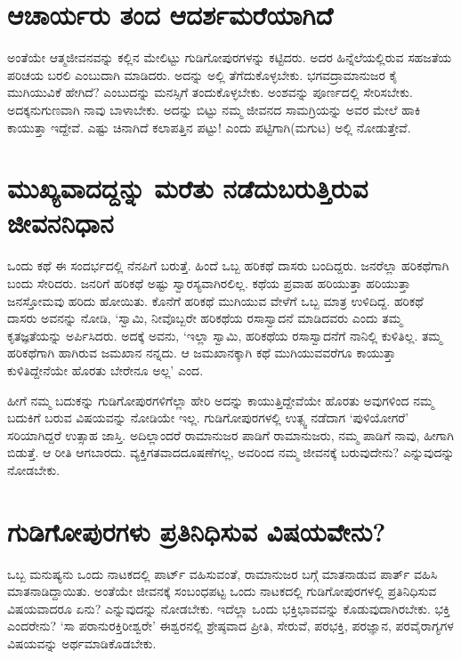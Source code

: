 \section*{ಆಚಾರ್ಯರು ತಂದ ಆದರ್ಶಮರೆಯಾಗಿದೆ}

ಅಂತೆಯೇ ಆತ್ಮಜೀವನವನ್ನು ಕಲ್ಲಿನ ಮೇಲಿಟ್ಟು ಗುಡಿಗೋಪುರಗಳನ್ನು ಕಟ್ಟಿದರು. ಅದರ ಹಿನ್ನೆಲೆಯಲ್ಲಿರುವ ಸಹಜತೆಯ ಪರಿಚಯ ಬರಲಿ ಎಂಬುದಾಗಿ ಮಾಡಿದರು. ಅದನ್ನು ಅಲ್ಲಿ ತೆಗೆದುಕೊಳ್ಳಬೇಕು. ಭಗವದ್ರಾಮಾನುಜರ ಕೈ ಮುಗಿಯುವಿಕೆ ಹೇಗಿದೆ? ಎಂಬುದನ್ನು ಮನಸ್ಸಿಗೆ ತಂದುಕೊಳ್ಳಬೇಕು. ಅಂಶವನ್ನು ಪೂರ್ಣದಲ್ಲಿ ಸೇರಿಸಬೇಕು. ಅದಕ್ಕನುಗುಣವಾಗಿ ನಾವು ಬಾಳಾಬೇಕು. ಅದನ್ನು ಬಿಟ್ಟು ನಮ್ಮ ಜೀವನದ ಸಾಮಗ್ರಿಯನ್ನು ಅವರ ಮೇಲೆ ಹಾಕಿ ಕಾಯುತ್ತಾ ಇದ್ದೇವೆ. ಎಷ್ಟು ಚಿನಾಗಿದೆ ಕಲಾಪತ್ತಿನ ಪಟ್ಟು! ಎಂದು ಪಟ್ಟಿಗಾಗಿ(ಮಗುಟ) ಅಲ್ಲಿ ನೋಡುತ್ತೇವೆ. 

\section*{ಮುಖ್ಯವಾದದ್ದನ್ನು ಮರೆತು ನಡೆದುಬರುತ್ತಿರುವ ಜೀವನನಿಧಾನ}

ಒಂದು ಕಥೆ ಈ ಸಂದರ್ಭದಲ್ಲಿ ನೆನಪಿಗೆ ಬರುತ್ತೆ. ಹಿಂದೆ ಒಬ್ಬ ಹರಿಕಥೆ ದಾಸರು ಬಂದಿದ್ದರು. ಜನರೆಲ್ಲಾ ಹರಿಕಥೆಗಾಗಿ ಬಂದು ಸೇರಿದರು. ಜನರಿಗೆ ಹರಿಕಥೆ ಅಷ್ಟು  ಸ್ವಾರಸ್ಯವಾಗಿರಲಿಲ್ಲ. ಕಥೆಯ ಪ್ರವಾಹ ಹರಿಯುತ್ತಾ ಹರಿಯುತ್ತಾ ಜನಸ್ತೋಮವು ಹರಿದು ಹೋಯಿತು. ಕೊನೆಗೆ ಹರಿಕಥೆ ಮುಗಿಯುವ ವೇಳೆಗೆ ಒಬ್ಬ ಮಾತ್ರ ಉಳಿದಿದ್ದ. ಹರಿಕಥೆ ದಾಸರು ಅವನನ್ನು ನೋಡಿ, `ಸ್ವಾಮಿ, ನೀವೊಬ್ಬರೇ ಹರಿಕಥೆಯ ರಸಾಸ್ವಾದನೆ ಮಾಡಿದವರು ಎಂದು ತಮ್ಮ ಕೃತಜ್ಞತೆಯನ್ನು ಅರ್ಪಿಸಿದರು. ಅದಕ್ಕೆ ಅವನು, `ಇಲ್ಲಾ ಸ್ವಾಮಿ, ಹರಿಕಥೆಯ ರಸಾಸ್ವಾದನೆಗೆ ನಾನಿಲ್ಲಿ ಕುಳಿತಿಲ್ಲ. ತಮ್ಮ ಹರಿಕಥೆಗಾಗಿ ಹಾಗಿರುವ ಜಮಖಾನ ನನ್ನದು. ಆ ಜಮಖಾನಕ್ಕಾಗಿ ಕಥೆ ಮುಗಿಯುವವರೆಗೂ ಕಾಯುತ್ತಾ ಕುಳಿತಿದ್ದೇನೆಯೇ ಹೊರತು ಬೇರೇನೂ ಅಲ್ಲ' ಎಂದ.

ಹೀಗೆ ನಮ್ಮ ಬದುಕನ್ನು ಗುಡಿಗೋಪುರಗಳಿಗೆಲ್ಲಾ ಹೇರಿ ಅದನ್ನು ಕಾಯುತ್ತಿದ್ದೇವೆಯೇ ಹೊರತು ಅವುಗಳಿಂದ ನಮ್ಮ ಬದುಕಿಗೆ ಬರುವ ವಿಷಯವನ್ನು ನೋಡಿಯೇ ಇಲ್ಲ. ಗುಡಿಗೋಪುರಗಳಲ್ಲಿ ಉತ್ಸ್ವ ನಡೆದಾಗ `ಪುಳಿಯೋಗರೆ' ಸರಿಯಾಗಿದ್ದರೆ ಉತ್ಸಾಹ ಜಾಸ್ತಿ. ಅದಿಲ್ಲಾಂದರೆ ರಾಮಾನುಜರ ಪಾಡಿಗೆ ರಾಮಾನುಜರು, ನಮ್ಮ ಪಾಡಿಗೆ ನಾವು, ಹೀಗಾಗಿ ಬಿಡುತ್ತೆ. ಆ ರೀತಿ ಆಗಬಾರದು. ವ್ಯಕ್ತಿಗತವಾದದೂಷಣೆಗಲ್ಲ, ಅವರಿಂದ ನಮ್ಮ ಜೀವನಕ್ಕೆ ಬರುವುದೇನು? ಎನ್ನುವುದನ್ನು ನೋಡಬೇಕು.

\section*{ಗುಡಿಗೋಪುರಗಳು ಪ್ರತಿನಿಧಿಸುವ ವಿಷಯವೇನು?}

ಒಬ್ಬ ಮನುಷ್ಯನು ಒಂದು ನಾಟಕದಲ್ಲಿ ಪಾರ್ಟ್ ವಹಿಸುವಂತೆ, ರಾಮಾನುಜರ ಬಗ್ಗೆ ಮಾತನಾಡುವ ಪಾರ್ತ್ ವಹಿಸಿ ಮಾತನಾಡಿದ್ದಾಯಿತು. ಅಂತೆಯೇ ಜೀವನಕ್ಕೆ ಸಂಬಂಧಪಟ್ಟ ಒಂದು ನಾಟಕದಲ್ಲಿ ಗುಡಿಗೋಪುರಗಳಲ್ಲಿ ಪ್ರತಿನಿಧಿಸುವ ವಿಷಯವಾದರೂ ಏನು? ಎನ್ನುವುದನ್ನು ನೋಡಬೇಕು. ಇದೆಲ್ಲಾ ಒಂದು ಭಕ್ತಿಭಾವವನ್ನು  ಕೊಡುವುದಾಗಿರಬೇಕು. ಭಕ್ತಿ ಎಂದರೇನು? `ಸಾ ಪರಾನುರಕ್ತಿರೀಶ್ವರೇ' ಈಶ್ವರನಲ್ಲಿ ಶ್ರೇಷ್ಠವಾದ ಪ್ರೀತಿ, ಸೇರುವೆ, ಪರಭಕ್ತಿ, ಪರಜ್ಞಾನ, ಪರವೈರಾಗ್ಯಗಳ ವಿಷಯವನ್ನು ಅರ್ಥಮಾಡಿಕೊಡಬೇಕು.

